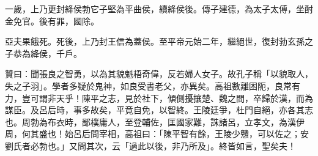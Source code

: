 \begin{pinyinscope}
一歲，上乃更封絳侯勃它子堅為平曲侯，續絳侯後。傳子建德，為太子太傅，坐酎金免官。後有罪，國除。

亞夫果餓死。死後，上乃封王信為蓋侯。至平帝元始二年，繼絕世，復封勃玄孫之子恭為絳侯，千戶。

贊曰：聞張良之智勇，以為其貌魁梧奇偉，反若婦人女子。故孔子稱「以貌取人，失之子羽」。學者多疑於鬼神，如良受書老父，亦異矣。高祖數離困阨，良常有力，豈可謂非天乎！陳平之志，見於社下，傾側擾攘楚、魏之間，卒歸於漢，而為謀臣。及呂后時，事多故矣，平竟自免，以智終。王陵廷爭，杜門自絕，亦各其志也。周勃為布衣時，鄙樸庸人，至登輔佐，匡國家難，誅諸呂，立孝文，為漢伊周，何其盛也！始呂后問宰相，高祖曰：「陳平智有餘，王陵少戇，可以佐之；安劉氏者必勃也。」又問其次，云「過此以後，非乃所及」。終皆如言，聖矣夫！


\end{pinyinscope}
